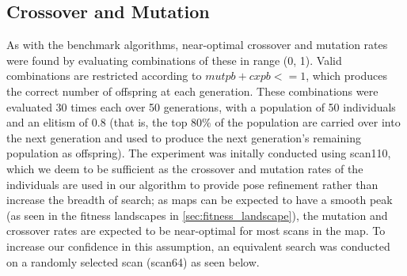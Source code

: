 \documentclass[authoryearcitations]{UoYCSproject}
\begin{document}
\subsection{Crossover and Mutation}
\label{subsec:elite_cxpb_mupb}
As with the benchmark algorithms, near-optimal crossover and mutation rates were found by evaluating combinations of these in range (0, 1). Valid combinations are restricted according to $mutpb + cxpb <= 1$, which produces the correct number of offspring at each generation. These combinations were evaluated 30 times each over 50 generations, with a population of 50 individuals and an elitism of 0.8 (that is, the top 80\% of the population are carried over into the next generation and used to produce the next generation's remaining population as offspring). The experiment was initally conducted using scan110, which we deem to be sufficient as the crossover and mutation rates of the individuals are used in our algorithm to provide pose refinement rather than increase the breadth of search; as maps can be expected to have a smooth peak (as seen in the fitness landscapes in \autoref{sec:fitness_landscape}), the mutation and crossover rates are expected to be near-optimal for most scans in the map. To increase our confidence in this assumption, an equivalent search was conducted on a randomly selected scan (scan64) as seen below.
\end{document}
